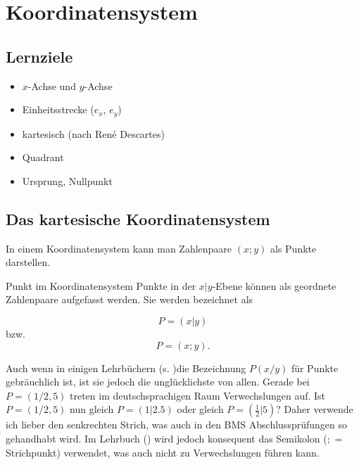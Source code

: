 
\section{Koordinatensystem}
\subsection*{Lernziele}

\begin{itemize}
\item $x$-Achse und $y$-Achse
\item Einheitsstrecke ($e_x$, $e_y$)
\item kartesisch (nach René Descartes)
\item Quadrant 
\item Ursprung, Nullpunkt
\end{itemize}

\newpage

\subsection{Das kartesische Koordinatensystem}
In einem Koordinatensystem kann man Zahlenpaare $(x; y)$ als Punkte
darstellen.

\begin{definition}{Punkt im Koordinatensystem}{}
  Punkte in der $x|y$-Ebene können als geordnete Zahlenpaare aufgefasst
  werden. Sie werden bezeichnet als

  $$P=(x|y)$$
  bzw.
  $$P=(x;y).$$

\end{definition}


\begin{bemerkung}{}{}
  Auch wenn in einigen Lehrbüchern  (s. \cite{frommenwiler17alg})die Bezeichnung $P(x/y)$ für Punkte gebräuchlich ist, ist
  sie jedoch die unglücklichste von allen. Gerade bei $P=(1/2,5)$
  treten im deutschsprachigen Raum Verwechslungen auf. Ist $P=(1/2,5)$
  nun gleich $P=(1 | 2.5)$ oder gleich $P=(\frac{1}{2} | 5)$?
  Daher verwende ich lieber den senkrechten Strich, was auch in den
  BMS Abschlussprüfungen so gehandhabt wird. Im Lehrbuch (\cite{marthaler21alg}) wird jedoch
  konsequent das Semikolon ($;$ = Strichpunkt) verwendet, was auch
  nicht zu Verwechslungen führen kann.
\end{bemerkung}
\newpage

